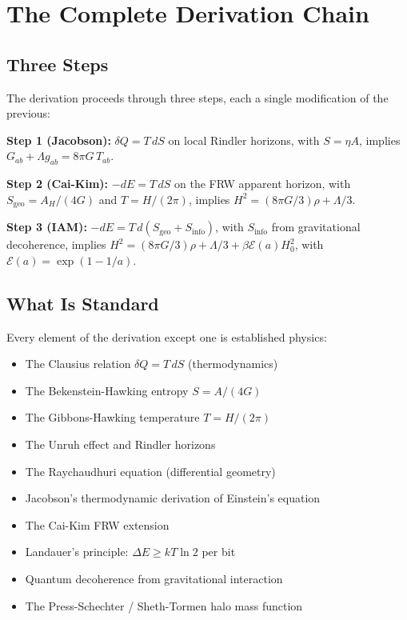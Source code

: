\documentclass[aps,prd,twocolumn,superscriptaddress,nofootinbib]{revtex4-2}
\begin{document}
\section{The Complete Derivation Chain}
\label{sec:chain}

\subsection{Three Steps}

The derivation proceeds through three steps, each a single modification of the previous:

\textbf{Step 1 (Jacobson):} $\delta Q = T\,dS$ on local Rindler horizons, with $S = \eta A$, implies $G_{ab} + \Lambda g_{ab} = 8\pi G\,T_{ab}$.

\textbf{Step 2 (Cai-Kim):} $-dE = T\,dS$ on the FRW apparent horizon, with $S_\text{geo} = A_H/(4G)$ and $T = H/(2\pi)$, implies $H^2 = (8\pi G/3)\rho + \Lambda/3$.

\textbf{Step 3 (IAM):} $-dE = T\,d(S_\text{geo} + S_\text{info})$, with $S_\text{info}$ from gravitational decoherence, implies $H^2 = (8\pi G/3)\rho + \Lambda/3 + \beta\mathcal{E}(a)H_0^2$, with $\mathcal{E}(a) = \exp(1-1/a)$.

\subsection{What Is Standard}

Every element of the derivation except one is established physics:
\begin{itemize}
\item The Clausius relation $\delta Q = T\,dS$ (thermodynamics)
\item The Bekenstein-Hawking entropy $S = A/(4G)$~\cite{Bekenstein1973,Hawking1975}
\item The Gibbons-Hawking temperature $T = H/(2\pi)$~\cite{Gibbons1977}
\item The Unruh effect and Rindler horizons~\cite{Unruh1976}
\item The Raychaudhuri equation (differential geometry)
\item Jacobson's thermodynamic derivation of Einstein's equation~\cite{Jacobson1995}
\item The Cai-Kim FRW extension~\cite{Cai2005}
\item Landauer's principle: $\Delta E \geq kT\ln 2$ per bit~\cite{Landauer1961}
\item Quantum decoherence from gravitational interaction~\cite{Zurek2003}
\item The Press-Schechter / Sheth-Tormen halo mass function~\cite{Press1974,Sheth1999}
\end{itemize}
\end{document}
